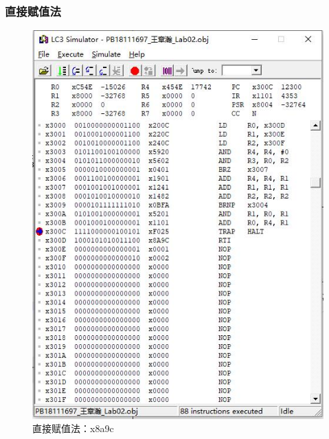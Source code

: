 \documentclass[UTF8]{article}
\begin{document}
	\subsubsection{直接赋值法}
	\begin{figure}[H]
		\begin{minipage}[H]{0.48\linewidth}
			\centering
			\includegraphics[scale=0.4]{x8a9c_2.jpg}
			\caption{直接赋值法：x8a9c}
			\label{x8a9c_2}
		\end{minipage}
		\qquad
		\begin{minipage}[H]{0.48\linewidth}
			\centering

\end{minipage}
\end{figure}
\end{document}
